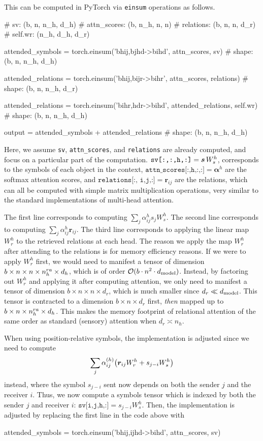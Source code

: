 This can be computed in PyTorch via \texttt{einsum} operations as follows.
\begin{python}
# sv: (b, n, n_h, d_h)
# attn_scores: (b, n_h, n, n)
# relations: (b, n, n, d_r)
# self.wr: (n_h, d_h, d_r)

attended_symbols = torch.einsum('bhij,bjhd->bihd', attn_scores, sv)
# shape: (b, n, n_h, d_h)

attended_relations = torch.einsum('bhij,bijr->bihr', attn_scores, relations)
# shape: (b, n, n_h, d_r)

attended_relations = torch.einsum('bihr,hdr->bihd', attended_relations, self.wr)
# shape: (b, n, n_h, d_h)

output = attended_symbols + attended_relations
# shape: (b, n, n_h, d_h)
\end{python}

Here, we assume \texttt{sv}, \texttt{attn\_scores}, and \texttt{relations} are already computed, and focus on a particular part of the computation. $\texttt{sv[:,:,h,:]} = \bm{s} \,W_s^h$, corresponds to the symbols of each object in the context, $\texttt{attn\_scores[:,h,:,:]} = \bm{\alpha}^h$ are the softmax attention scores, and $\texttt{relations[:, i,j,:]} = \bm{r}_{ij}$ are the relations, which can all be computed with simple matrix multiplication operations, very similar to the standard implementations of multi-head attention.

The first line corresponds to computing $\sum_{j} \alpha_{ij}^h s_j W_s^h$. The second line corresponds to computing $\sum_{j} \alpha_{ij}^h \bm{r}_{ij}$. The third line corresponds to applying the linear map $W_r^h$ to the retrieved relations at each head. The reason we apply the map $W_r^h$ after attending to the relations is for memory efficiency reasons. If we were to apply $W_r^h$ first, we would need to manifest a tensor of dimension $b \times n \times n \times n_h^{ra} \times d_h$, which is of order ${\mathcal{O}}(b \cdot n^2 \cdot d_{\mathrm{model}})$. Instead, by factoring out $W_r^h$ and applying it after computing attention, we only need to manifest a tensor of dimension $b \times n \times n \times d_r$, which is much smaller since $d_r \ll d_{\mathrm{model}}$. This tensor is contracted to a dimension $b \times n \times d_r$ first, \textit{then} mapped up to $b \times n  \times n_h^{ra} \times d_h$. This makes the memory footprint of relational attention of the same order as standard (sensory) attention when $d_r \asymp n_h$.

When using position-relative symbols, the implementation is adjusted since we need to compute
\begin{equation}
    \sum_{j} \alpha_{ij}^{(h)} \big(\bm{r}_{ij} W_r^h + s_{j-i} W_s^h\big)
\end{equation}
instead, where the symbol $s_{j-i}$ sent now depends on both the sender $j$ and the receiver $i$. Thus, we now compute a symbols tensor which is indexed by both the sender $j$ and receiver $i$: $\texttt{sv[i,j,h,:]} = s_{j-i} W_s^h$. Then, the implementation is adjusted by replacing the first line in the code above with
\begin{python}
    attended_symbols = torch.einsum('bhij,ijhd->bihd', attn_scores, sv)
\end{python}

